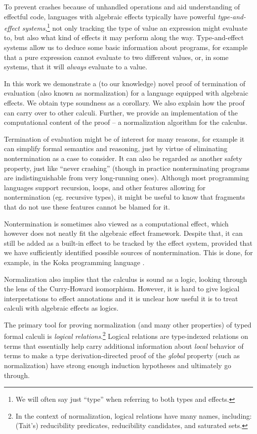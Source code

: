 \documentclass[a4paper, 11pt,titlepage, openright, twoside]{report}
\newcommand{\+}{\enspace}
\begin{document}
To prevent crashes because of unhandled operations and aid understanding of effectful code,
languages with algebraic effects typically have powerful
\textit{type-and-effect systems},\footnote{
We will often say just ``type'' when referring to both types and effects.}
not only tracking the type of value an expression might evaluate to, but also
what kind of effects it may perform along the way.
Type-and-effect systems allow us to deduce some basic information about programs,
for example that a pure expression cannot evaluate to two different values,
or, in some systems, that it will {\em always} evaluate to a value.

In this work we demonstrate a (to our knowledge) novel proof of
termination of evaluation (also known as normalization) for a
language \cite{fscd19} equipped with algebraic effects.
We obtain type soundness as a corollary.
We also explain how the proof can carry over to other calculi.
Further, we provide an implementation of the computational content of the proof –
a normalization algorithm for the calculus.

Termination of evaluation might be of interest for many reasons,
for example it can simplify formal semantics and reasoning, just by virtue of
eliminating nontermination as a case to consider.
It can also be regarded as another safety property, just like ``never crashing''
(though in practice nonterminating programs are indistinguishable from very long-running ones).
Although most programming languages support recursion, loops, and other
features allowing for nontermination (eg. recursive types),
it might be useful to know that fragments that do not use these features cannot be blamed
for it.

Nontermination is sometimes also viewed as a computational effect,
which however does not neatly fit the algebraic effect framework.
Despite that, it can still be added as a built-in effect to be tracked by
the effect system, provided that we have sufficiently identified possible sources
of nontermination.
This is done, for example, in the Koka programming language \cite{koka}.

Normalization also implies that the calculus is sound as a logic,
looking through the lens of the Curry-Howard isomorphism.
However, it is hard to give logical interpretations to effect annotations \cite{oleg}
and it is unclear how useful it is to treat calculi with algebraic effects as logics.

The primary tool for proving normalization (and many other properties) of
typed formal calculi is {\em logical relations}.\footnote{
	In the context of normalization, logical relations have many names, including:
	(Tait's) reducibility predicates, reducibility candidates, and saturated sets.
}
Logical relations are
type-indexed relations on terms that essentially help carry additional
information about {\em local} behavior of terms to make a type derivation-directed
proof of the {\em global} property (such as normalization)
have strong enough induction hypotheses and ultimately go through.
\end{document}
